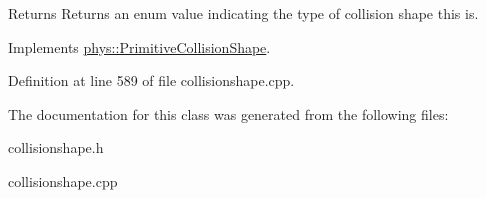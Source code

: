 \begin{DoxyReturn}{Returns}
Returns an enum value indicating the type of collision shape this is. 
\end{DoxyReturn}
 

Implements \hyperlink{classphys_1_1PrimitiveCollisionShape_a16a167ec75ac95aa101b6a9b116e837d}{phys::PrimitiveCollisionShape}.



Definition at line 589 of file collisionshape.cpp.



The documentation for this class was generated from the following files:\begin{DoxyCompactItemize}
\item 
collisionshape.h\item 
collisionshape.cpp\end{DoxyCompactItemize}
